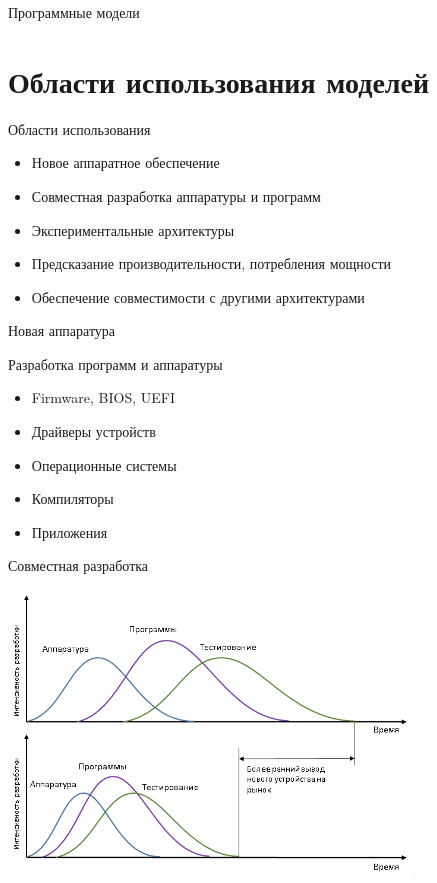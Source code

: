 \documentclass{beamer}
\begin{document}
\begin{frame}{Программные модели}
\centering 


\end{frame}

\section{Области использования моделей}

\begin{frame}{Области использования}

\begin{itemize}
\item Новое аппаратное обеспечение
\item Совместная разработка аппаратуры и программ
\item Экспериментальные архитектуры
\item Предсказание производительности, потребления мощности
\item Обеспечение совместимости с другими архитектурами
\end{itemize}

\end{frame}


\begin{frame}{Новая аппаратура}



\end{frame}

\begin{frame}{Разработка программ и аппаратуры}

\begin{itemize}
\item Firmware, BIOS, UEFI
\item Драйверы устройств
\item Операционные системы
\item Компиляторы
\item Приложения
\end{itemize}

\end{frame}

\begin{frame}{Совместная разработка}

\includegraphics[width=0.8\textwidth]{shift-left} %

\end{frame}
\end{document}
